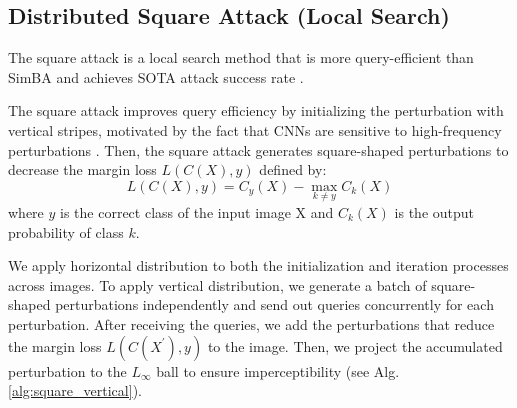 
\subsection{Distributed Square Attack (Local Search)}

The square attack is a local search method that is more query-efficient than SimBA and achieves SOTA attack success rate \citep{andriushchenko2020square}. 

The square attack improves query efficiency by initializing the perturbation with vertical stripes, motivated by the fact that CNNs are sensitive to high-frequency perturbations \citep{yin2019fourier}. Then, the square attack generates square-shaped perturbations to decrease the margin loss $L(C(X), y)$ defined by:
\begin{equation}
L(C(X), y) = C_y(X) - \max_{k \neq y}C_k(X)    
\end{equation}
where $y$ is the correct class of the input image X and $C_k(X)$ is the output probability of class $k$.

We apply horizontal distribution to both the initialization and iteration processes across images. To apply vertical distribution, we generate a batch of square-shaped perturbations independently and send out queries concurrently for each perturbation. After receiving the queries, we add the perturbations that reduce the margin loss $L(C(X^{'}), y)$ to the image. Then, we project the accumulated perturbation to the $L_\infty$ ball to ensure imperceptibility (see Alg. \ref{alg:square_vertical}).


